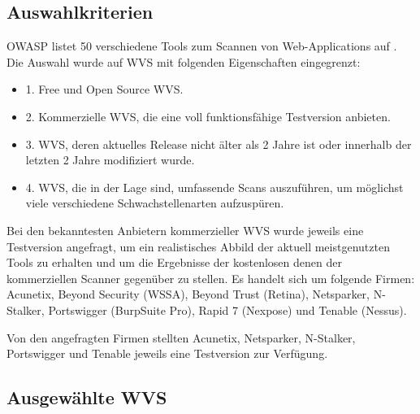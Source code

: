 \documentclass[12pt,oneside,a4paper,parskip]{scrbook}
\begin{document}
  \subsection{Auswahlkriterien}
  OWASP listet 50 verschiedene Tools zum Scannen von Web-Applications auf
  \cite{OWASPtools}. Die Auswahl wurde auf WVS mit folgenden Eigenschaften eingegrenzt:
  \begin{itemize}
    \item 1. Free und Open Source WVS.
    \item 2. Kommerzielle WVS, die eine voll funktionsfähige Testversion anbieten.
    \item 3. WVS, deren aktuelles Release nicht älter als 2 Jahre ist oder innerhalb der letzten 2 Jahre modifiziert wurde.
    \item 4. WVS, die in der Lage sind, umfassende Scans auszuführen, um möglichst viele verschiedene Schwachstellenarten aufzuspüren.
  \end{itemize}
  Bei den bekanntesten Anbietern kommerzieller WVS wurde jeweils eine Testversion angefragt, um ein realistisches Abbild der aktuell meistgenutzten Tools zu erhalten und um die Ergebnisse der kostenlosen denen der kommerziellen Scanner gegenüber zu stellen. Es handelt sich um folgende Firmen:
  \\Acunetix, Beyond Security (WSSA), Beyond Trust (Retina), Netsparker, N-Stalker, Portswigger (BurpSuite Pro), Rapid 7 (Nexpose) und Tenable (Nessus).

  Von den angefragten Firmen stellten Acunetix, Netsparker, N-Stalker, Portswigger und Tenable jeweils eine Testversion zur Verfügung.

  \subsection{Ausgewählte WVS}
\end{document}
